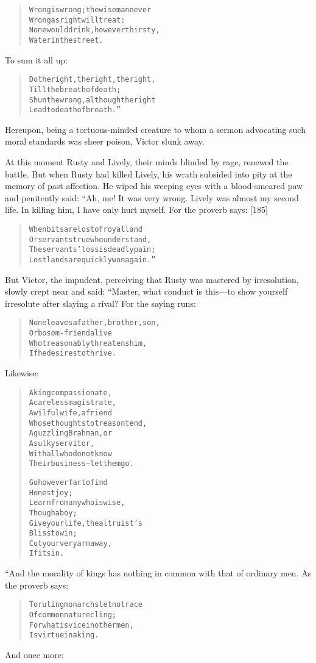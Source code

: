 \documentclass[article, twoside, 14pt]{memoir}
\renewenvironment{verbatim}{%
\begin{quote}%
\vskip -10pt%
\begin{alltt}\normalfont\large}{\end{alltt}%
\end{quote}%
\vskip -10pt
} %
\begin{document}
\begin{verbatim}
Wrong is wrong; the wise man never
    Wrong as right will treat:
None would drink, however thirsty,
    Water in the street.
\end{verbatim}
To sum it all up:

\begin{verbatim}
Do the right, the right, the right,
    Till the breath of death;
Shun the wrong, although the right
    Lead to death of breath.”
\end{verbatim}
Hereupon, being a tortuous-minded creature to whom a sermon
advocating such moral standards was sheer poison, Victor slunk
away.

At this moment Rusty and Lively, their minds blinded by rage,
renewed the battle. But when Rusty had killed Lively, his wrath
subsided into pity at the memory of past affection. He wiped his
weeping eyes with a blood-smeared paw and penitently said: “Ah, me!
It was very wrong. Lively was almost my second life. In killing
him, I have only hurt myself. For the proverb says: [185]

\begin{verbatim}
When bits are lost of royal land
Or servants true who understand,
The servants' loss is deadly pain;
Lost lands are quickly won again.”
\end{verbatim}
But Victor, the impudent, perceiving that Rusty was mastered by
irresolution, slowly crept near and said: “Master, what conduct is
this---to show yourself irresolute after slaying a rival? For the
saying runs:

\begin{verbatim}
None leaves a father, brother, son,
    Or bosom-friend alive
Who treasonably threatens him,
    If he desires to thrive.
\end{verbatim}
Likewise:

\begin{verbatim}
A king compassionate,
A careless magistrate,
A wilful wife, a friend
Whose thoughts to treason tend,
A guzzling Brahman, or
A sulky servitor,
With all who do not know
Their business--let them go.

Go however far to find
    Honest joy;
Learn from any who is wise,
    Though a boy;
Give your life, the altruist's
    Bliss to win;
Cut your very arm away,
    If it sin.
\end{verbatim}
“And the morality of kings has nothing in common with that of
ordinary men. As the proverb says:

\begin{verbatim}
To ruling monarchs let no trace
    Of common nature cling;
For what is vice in other men,
    Is virtue in a king.
\end{verbatim}
And once more:
\end{document}
